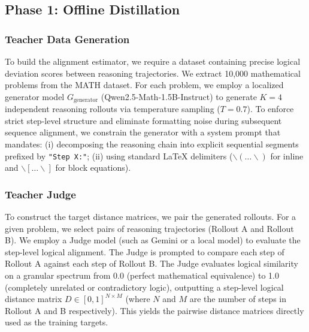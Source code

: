 \documentclass[conference]{IEEEtran}
\begin{document}
\subsection{Phase 1: Offline Distillation}

\subsubsection{Teacher Data Generation}
To build the alignment estimator, we require a dataset containing precise logical deviation scores between reasoning trajectories. We extract 10,000 mathematical problems from the MATH dataset. For each problem, we employ a localized generator model $G_{\text{generator}}$ (Qwen2.5-Math-1.5B-Instruct) to generate $K = 4$ independent reasoning rollouts via temperature sampling ($T=0.7$).
To enforce strict step-level structure and eliminate formatting noise during subsequent sequence alignment, we constrain the generator with a system prompt that mandates: (i) decomposing the reasoning chain into explicit sequential segments prefixed by \texttt{"Step X:"}; (ii) using standard LaTeX delimiters (\(\backslash( \dots \backslash)\) for inline and \(\backslash[ \dots \backslash]\) for block equations).

\subsubsection{Teacher Judge}
To construct the target distance matrices, we pair the generated rollouts. For a given problem, we select pairs of reasoning trajectories (Rollout A and Rollout B). We employ a Judge model (such as Gemini or a local model) to evaluate the step-level logical alignment.
The Judge is prompted to compare each step of Rollout A against each step of Rollout B. The Judge evaluates logical similarity on a granular spectrum from 0.0 (perfect mathematical equivalence) to 1.0 (completely unrelated or contradictory logic), outputting a step-level logical distance matrix $D \in [0, 1]^{N \times M}$ (where $N$ and $M$ are the number of steps in Rollout A and B respectively). This yields the pairwise distance matrices directly used as the training targets.
\end{document}

